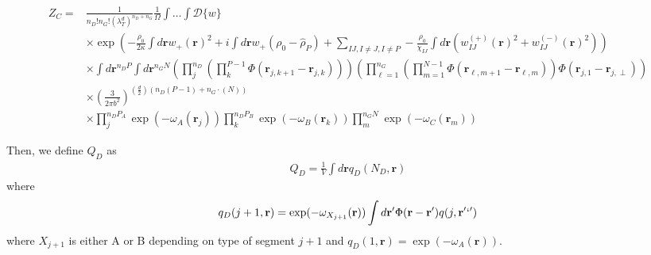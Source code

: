 \documentclass{article}
\begin{document}
  \begin{align*}
    Z_C =& \frac{1}{n_D!n_G! \left( \lambda_T^d \right)^{n_D+n_G}}
      \frac{1}{\Omega}
      \int \hdots \int \mathcal{D} \{w\} \\
      &\times
      \exp \left(
        - \frac{\rho_0}{2\kappa} \int d \mathbf{r} w_+(\mathbf{r})^2
        + i \int d\mathbf{r} w_+ \left(\rho_0 -\hat{\rho}_{P}  \right)
        + \sum_{IJ,I \ne J, I \ne P}
        - \frac{\rho_0}{\chi_{IJ}}
        \int d \mathbf{r}
        \left(
          w_{IJ}^{(+)} (\mathbf{r})^2 + w_{IJ}^{(-)} (\mathbf{r})^2
        \right)
      \right) \\
      &\times \int d \mathbf{r}^{n_D P} \int d \mathbf{r}^{n_G N}
        \left(\prod_j^{n_D} 
        \left( \prod_k^{P-1}
        \Phi(\mathbf{r}_{j,k+1} - \mathbf{r}_{j,k})\right) 
        \right)  
      \left(   \prod_{\ell=1}^{n_G} 
      \left(
        \prod_{m=1}^{N-1}  
        \Phi (\mathbf{r}_{\ell,m+1} - \mathbf{r}_{\ell,m})
        \right)
        \Phi \left(
          \mathbf{r}_{j,1} - \mathbf{r}_{j,\perp}
          \right) 
        \right) 
          \\ 
      & \times  
      \left( \frac{3}{2\pi b^2} \right) 
      ^ {(\frac{d}{2}) (n_D (P-1) + n_G \cdot (N ))  }
      \\
      &\times
      \prod_{j}^{n_{D}P_{A}}
      \exp \left( -\omega_A(\mathbf{r}_j) \right)
      \prod_{k}^{n_{D}P_{B}}
      \exp \left( -\omega_B(\mathbf{r}_k) \right)
      \prod_{m}^{n_{G}N_{}}
      \exp \left( -\omega_C(\mathbf{r}_m) \right)
  \end{align*}
  
  
  Then, we define $Q_D$ as
  \begin{align*}
    Q_D = \frac{1}{V} \int d\mathbf{r} q_D (N_D, \mathbf{r})
  \end{align*}
  where
  \begin{align*}
    q_D(j+1, \mathbf{r}) = \exp(-\omega_{X_{j+1}}(\mathbf{r}))
      \int d \mathbf{r}^\prime \Phi(\mathbf{r} - \mathbf{r}^\prime)
      q(j, \mathbf{r}'`')  
  \end{align*}
  where $X_{j+1}$ is either A or B depending on type of segment $j+1$
    and $q_D(1, \mathbf{r}) = \exp(-\omega_A(\mathbf{r}))$.
  \\
\end{document}
